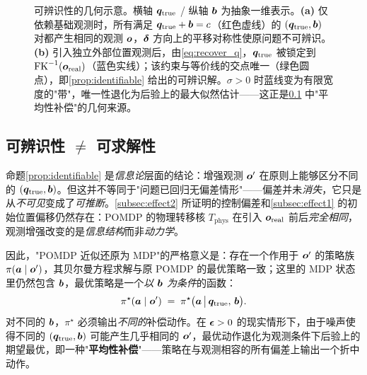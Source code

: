 \begin{figure}[!htbp]
  \caption{可辨识性的几何示意。横轴 $\bm{q}_\text{true}$ / 纵轴 $\bm{b}$ 为抽象一维表示。\textbf{(a)} 仅依赖基础观测时，所有满足 $\bm{q}_\text{true} + \bm{b} = c$（红色虚线）的 $(\bm{q}_\text{true}, \bm{b})$ 对都产生相同的观测 $\bm{o}$，$\bm{\delta}$ 方向上的平移对称性使原问题不可辨识。\textbf{(b)} 引入独立外部位置观测后，由\cref{eq:recover_q}，$\bm{q}_\text{true}$ 被锁定到 $\text{FK}^{-1}(\bm{o}_\text{real})$（蓝色实线）；该约束与等价线的交点唯一（绿色圆点），即\cref{prop:identifiable} 给出的可辨识解。$\sigma > 0$ 时蓝线变为有限宽度的"带"，唯一性退化为后验上的最大似然估计——这正是\cref{subsec:identifiability_vs_solvability} 中"平均性补偿"的几何来源。}
  \label{fig:identifiability}
\end{figure}

\subsection{可辨识性 \texorpdfstring{$\neq$}{≠} 可求解性}\label{subsec:identifiability_vs_solvability}

命题\ref{prop:identifiable} 是\emph{信息论}层面的结论：增强观测 $\bm{o}'$ 在原则上能够区分不同的 $(\bm{q}_{\text{true}}, \bm{b})$。但这并不等同于"问题已回归无偏差情形"——偏差并未\emph{消失}，它只是从\emph{不可见}变成了\emph{可推断}。\cref{subsec:effect2} 所证明的控制偏差和\cref{subsec:effect1} 的初始位置偏移仍然存在：POMDP 的物理转移核 $T_{\text{phys}}$ 在引入 $\bm{o}_{\text{real}}$ 前后\emph{完全相同}，观测增强改变的是\emph{信息结构}而非\emph{动力学}。

因此，"POMDP 近似还原为 MDP"的严格意义是：存在一个作用于 $\bm{o}'$ 的策略族 $\pi(\bm{a} \mid \bm{o}')$，其贝尔曼方程求解与原 POMDP 的最优策略一致；这里的 MDP 状态里仍然包含 $\bm{b}$，最优策略是一个\emph{以 $\bm{b}$ 为条件}的函数：
\begin{equation}
  \pi^\star(\bm{a} \mid \bm{o}') \;=\; \pi^\star\big(\bm{a} \,\big|\, \bm{q}_{\text{true}},\,\bm{b}\big).
  \label{eq:conditional_policy}
\end{equation}
对不同的 $\bm{b}$，$\pi^\star$ 必须输出\emph{不同的}补偿动作。在 $\bm{\epsilon} > 0$ 的现实情形下，由于噪声使得不同的 $(\bm{q}_{\text{true}}, \bm{b})$ 可能产生几乎相同的 $\bm{o}'$，最优动作退化为观测条件下后验上的期望最优，即一种"\textbf{平均性补偿}"——策略在与观测相容的所有偏差上输出一个折中动作。

